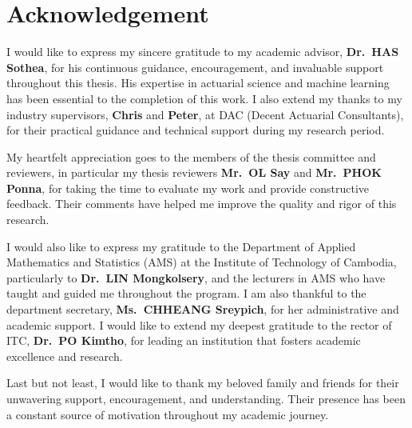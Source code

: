 \chapter*{\centering Acknowledgement}

\hs I would like to express my sincere gratitude to my academic advisor, \textbf{Dr.\ HAS Sothea}, for his continuous guidance, encouragement, and invaluable support throughout this thesis. His expertise in actuarial science and machine learning has been essential to the completion of this work. I also extend my thanks to my industry supervisors, \textbf{Chris} and \textbf{Peter}, at DAC (Decent Actuarial Consultants), for their practical guidance and technical support during my research period.

\hs My heartfelt appreciation goes to the members of the thesis committee and reviewers, in particular my thesis reviewers \textbf{Mr.\ OL Say} and \textbf{Mr.\ PHOK Ponna}, for taking the time to evaluate my work and provide constructive feedback. Their comments have helped me improve the quality and rigor of this research.

\hs I would also like to express my gratitude to the Department of Applied Mathematics and Statistics (AMS) at the Institute of Technology of Cambodia, particularly to \textbf{Dr.\ LIN Mongkolsery}, and the lecturers in AMS who have taught and guided me throughout the program. I am also thankful to the department secretary, \textbf{Ms.\ CHHEANG Sreypich}, for her administrative and academic support. I would like to extend my deepest gratitude to the rector of ITC, \textbf{Dr.\ PO Kimtho}, for leading an institution that fosters academic excellence and research.

\hs Last but not least, I would like to thank my beloved family and friends for their unwavering support, encouragement, and understanding. Their presence has been a constant source of motivation throughout my academic journey.
